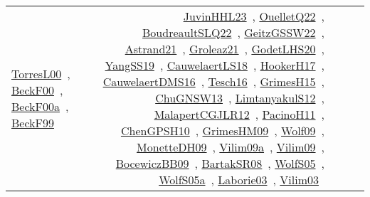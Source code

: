 {\begin{longtable}{p{3cm}r>{\raggedright\arraybackslash}p{6cm}>{\raggedright\arraybackslash}p{6cm}>{\raggedright\arraybackslash}p{8cm}}
\href{../works/TorresL00.pdf}{TorresL00}~\cite{TorresL00}, \href{../works/BeckF00.pdf}{BeckF00}~\cite{BeckF00}, \href{../works/BeckF00a.pdf}{BeckF00a}~\cite{BeckF00a}, \href{../works/BeckF99.pdf}{BeckF99}~\cite{BeckF99} & \href{../works/JuvinHHL23.pdf}{JuvinHHL23}~\cite{JuvinHHL23}, \href{../works/OuelletQ22.pdf}{OuelletQ22}~\cite{OuelletQ22}, \href{../works/BoudreaultSLQ22.pdf}{BoudreaultSLQ22}~\cite{BoudreaultSLQ22}, \href{../works/GeitzGSSW22.pdf}{GeitzGSSW22}~\cite{GeitzGSSW22}, \href{../works/Astrand21.pdf}{Astrand21}~\cite{Astrand21}, \href{../works/Groleaz21.pdf}{Groleaz21}~\cite{Groleaz21}, \href{../works/GodetLHS20.pdf}{GodetLHS20}~\cite{GodetLHS20}, \href{../works/YangSS19.pdf}{YangSS19}~\cite{YangSS19}, \href{../works/CauwelaertLS18.pdf}{CauwelaertLS18}~\cite{CauwelaertLS18}, \href{../works/HookerH17.pdf}{HookerH17}~\cite{HookerH17}, \href{../works/CauwelaertDMS16.pdf}{CauwelaertDMS16}~\cite{CauwelaertDMS16}, \href{../works/Tesch16.pdf}{Tesch16}~\cite{Tesch16}, \href{../works/GrimesH15.pdf}{GrimesH15}~\cite{GrimesH15}, \href{../works/ChuGNSW13.pdf}{ChuGNSW13}~\cite{ChuGNSW13}, \href{../works/LimtanyakulS12.pdf}{LimtanyakulS12}~\cite{LimtanyakulS12}, \href{../works/MalapertCGJLR12.pdf}{MalapertCGJLR12}~\cite{MalapertCGJLR12}, \href{../works/PacinoH11.pdf}{PacinoH11}~\cite{PacinoH11}, \href{../works/ChenGPSH10.pdf}{ChenGPSH10}~\cite{ChenGPSH10}, \href{../works/GrimesHM09.pdf}{GrimesHM09}~\cite{GrimesHM09}, \href{../works/Wolf09.pdf}{Wolf09}~\cite{Wolf09}, \href{../works/MonetteDH09.pdf}{MonetteDH09}~\cite{MonetteDH09}, \href{../works/Vilim09a.pdf}{Vilim09a}~\cite{Vilim09a}, \href{../works/Vilim09.pdf}{Vilim09}~\cite{Vilim09}, \href{../works/BocewiczBB09.pdf}{BocewiczBB09}~\cite{BocewiczBB09}, \href{../works/BartakSR08.pdf}{BartakSR08}~\cite{BartakSR08}, \href{../works/WolfS05.pdf}{WolfS05}~\cite{WolfS05}, \href{../works/WolfS05a.pdf}{WolfS05a}~\cite{WolfS05a}, \href{../works/Laborie03.pdf}{Laborie03}~\cite{Laborie03}, \href{../works/Vilim03.pdf}{Vilim03}~\cite{Vilim03}\\

\end{longtable}}
